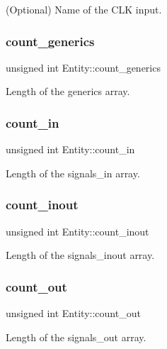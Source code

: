 (Optional) Name of the C\+LK input. \mbox{\label{struct_entity_a20a2de116010cce381f1127dae0b2218}} 
\subsubsection{\texorpdfstring{count\_generics}{count\_generics}}
{\footnotesize\ttfamily unsigned int Entity\+::count\+\_\+generics}

Length of the {\ttfamily generics} array. \mbox{\label{struct_entity_a92911aaab51c820215510b0546570b64}} 
\subsubsection{\texorpdfstring{count\_in}{count\_in}}
{\footnotesize\ttfamily unsigned int Entity\+::count\+\_\+in}

Length of the {\ttfamily signals\+\_\+in} array. \mbox{\label{struct_entity_a54b70a8bdd98d2752f6ff9f261c552fd}} 
\subsubsection{\texorpdfstring{count\_inout}{count\_inout}}
{\footnotesize\ttfamily unsigned int Entity\+::count\+\_\+inout}

Length of the {\ttfamily signals\+\_\+inout} array. \mbox{\label{struct_entity_a0cc932f4ed6b00e372488b3a753674ac}} 
\subsubsection{\texorpdfstring{count\_out}{count\_out}}
{\footnotesize\ttfamily unsigned int Entity\+::count\+\_\+out}

Length of the {\ttfamily signals\+\_\+out} array. \mbox{\label{struct_entity_a92738012e3a6611f840cf0eb2813c2e6}} 
